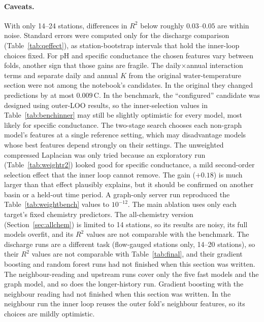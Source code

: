 \documentclass[11pt]{article}
\begin{document}
\paragraph{Caveats.} With only 14--24 stations, differences in $R^2$ below roughly $0.03$--$0.05$
are within noise. Standard errors were computed only for the discharge comparison
(Table~\ref{tab:qeffect}), as station-bootstrap intervals that hold the inner-loop choices fixed. For pH and specific conductance the chosen
features vary between folds, another sign that those gains are fragile. The daily$\times$annual
interaction terms and separate daily and annual $K$ from the original water-temperature section
were not among the notebook's candidates. In the original they changed predictions by at most
$0.009$\,\textdegree C. In the benchmark, the ``configured'' candidate was designed using outer-LOO
results, so the inner-selection values in Table~\ref{tab:benchinner} may still be slightly
optimistic for every model, most likely for specific conductance. The two-stage search chooses each
non-graph model's features at a single reference setting, which may disadvantage models whose best
features depend strongly on their settings. The unweighted compressed Laplacian was only tried because
an exploratory run (Table~\ref{tab:weightr2}) looked good for specific conductance, a mild
second-order selection effect that the inner loop cannot remove. The gain ($+0.18$) is much larger
than that effect plausibly explains, but it should be confirmed on another basin or a held-out time
period. A graph-only server run reproduced the Table~\ref{tab:weightbench} values to $10^{-12}$.
The main ablation uses only each target's fixed chemistry predictors. The all-chemistry version
(Section~\ref{sec:allchem}) is limited to 14 stations, so its results are noisy, its full models
overfit, and its $R^2$ values are not comparable with the benchmark. The discharge runs are a
different task (flow-gauged stations only, 14--20 stations), so their $R^2$ values are not
comparable with Table~\ref{tab:final}, and their gradient boosting and random forest runs had not
finished when this section was written. The neighbour-reading and upstream runs cover only the
five fast models and the graph model, and so does the longer-history run. Gradient boosting with
the neighbour reading had not finished when this section was written. In the neighbour run the inner loop reuses the outer fold's
neighbour features, so its choices are mildly optimistic.
\end{document}
